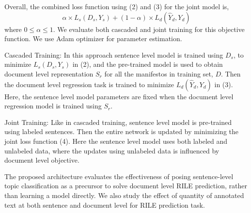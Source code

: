 \documentclass[11pt,a4paper]{article}
\begin{document}
Overall, the combined loss function using (2) and (3) for the joint model is,
\begin{equation}
 \alpha \times L_{s}(D_{s},Y_{s}) + (1-\alpha) \times L_{d}(\hat{Y}_{d}, Y_{d})
\end{equation}
where $0 \le \alpha \le 1$.
We evaluate both cascaded and joint training for this objective function. We use Adam optimizer \cite{DBLP:journals/corr/KingmaB14} for parameter estimation. 
\begin{description}
\item{Cascaded Training:} In this approach sentence level model is trained using $D_{s}$, to minimize $L_{s}(D_{s},Y_{s})$ in (2), and the pre-trained model is used to obtain document level representation $S_{r}$ for all the manifestos in training set, $D$. Then the document level regression task is trained to minimize $L_{d}(\hat{Y}_{d}, Y_{d})$ in (3). Here, the sentence level model parameters are fixed when the document level regression model is trained using $S_{r}$.

\item{Joint Training:} Like in cascaded training, sentence level model is pre-trained using labeled sentences. Then the entire network is updated by minimizing the joint loss function (4). Here the sentence level model uses both labeled and unlabeled data, where the updates using unlabeled data is influenced by document level objective.
\end{description}


The proposed architecture evaluates the effectiveness of posing sentence-level topic classification as a precursor to solve document level RILE prediction, rather than learning a model directly.  We also study the effect of quantity of annotated text at both sentence and document level for RILE prediction task. 


\end{document}
